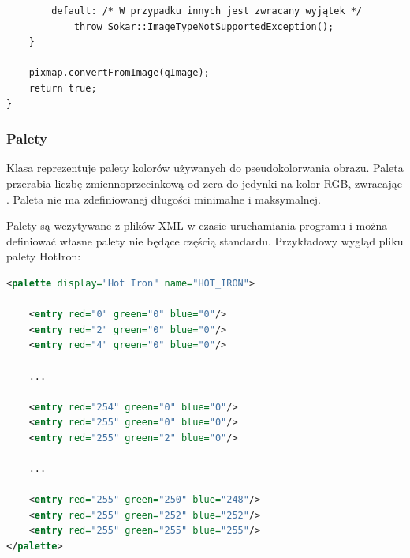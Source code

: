 \begin{itemize}
\begin{lstlisting}
        default: /* W przypadku innych jest zwracany wyjątek */
            throw Sokar::ImageTypeNotSupportedException();
    }

    pixmap.convertFromImage(qImage);
    return true;
}
\end{lstlisting}
\end{itemize}

\subsubsection{Palety}
Klasa  reprezentuje palety kolorów używanych do pseudokolorwania obrazu.
Paleta przerabia liczbę zmiennoprzecinkową od zera do jedynki na kolor RGB, zwracając .
Paleta nie ma zdefiniowanej długości minimalne i maksymalnej.

\par
Palety są wczytywane z plików XML w czasie uruchamiania programu i można definiować własne palety nie będące częścią standardu.
Przykładowy wygląd pliku palety HotIron:
\begin{lstlisting}[language=XML]
<palette display="Hot Iron" name="HOT_IRON">

    <entry red="0" green="0" blue="0"/>
    <entry red="2" green="0" blue="0"/>
    <entry red="4" green="0" blue="0"/>

    ...

    <entry red="254" green="0" blue="0"/>
    <entry red="255" green="0" blue="0"/>
    <entry red="255" green="2" blue="0"/>

    ...

    <entry red="255" green="250" blue="248"/>
    <entry red="255" green="252" blue="252"/>
    <entry red="255" green="255" blue="255"/>
</palette>
\end{lstlisting}